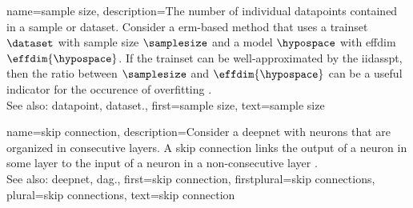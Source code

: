{name={sample size},
	description={The number of individual \glspl{datapoint} contained in a 
	    \gls{sample} or \gls{dataset}. Consider a \gls{erm}-based method that uses a 
		\gls{trainset} $\dataset$ with sample size $\samplesize$ 
		and a \gls{model} $\hypospace$ with \gls{effdim} $\effdim{\hypospace}$. If the \gls{trainset} can 
		be well-approximated by the \gls{iidasspt}, then the ratio between $\samplesize$ 
		and $\effdim{\hypospace}$ can be a useful indicator for the occurence of \gls{overfitting} \cite[Ch. 6]{MLBasics}.
				\\
		See also: \gls{datapoint}, \gls{dataset}.},
	first={sample size},
	text={sample size}
}

 {name={skip connection},
  description={Consider a \gls{deepnet} with neurons that are organized 
               in consecutive \glspl{layer}. A skip connection links the output of a neuron in 
			   some \gls{layer} to the input of a neuron in a non-consecutive \gls{layer} \cite{HeResidual2016}.\\
		See also: \gls{deepnet}, \gls{dag}.},
 	first={skip connection},
 	firstplural={skip connections}, 
 	plural={skip connections}, 
 	text={skip connection}
 }

